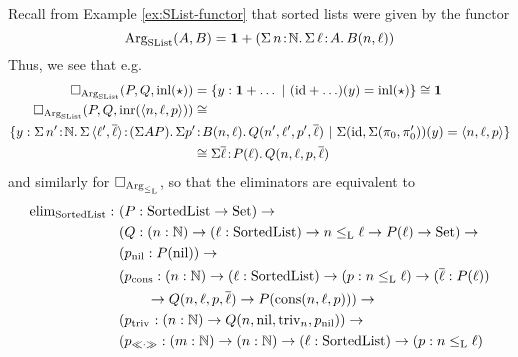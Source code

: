 \documentclass[orivec,envcountsame, ,envcountsect]{llncs}
\begin{document}
 \begin{example}
   Recall from Example \ref{ex:SList-functor} that sorted lists were given by the functor
\[ %
  \ArgSList(A, B) = \one + (\Sigma\, n\!:\!\Nat .\,\Sigma\,\ell\!:\!A.\, B(n,\ell))
\] %
   Thus, we see that e.g.\ 
   \begin{align*}
\BOX_{\ArgSList}(P, Q, \inl(\oneelt)) &=  
\{ y : \one + \ldots \ |\ (\id + \ldots)(y) = \inl(\oneelt) \} \cong \one \\
\BOX_{\ArgSList}(P, Q, \inr(\langle n, \ell, p\rangle)) &\cong \\
\{ y : \Sigma\, n'\!:\!\Nat .\,\Sigma\,\langle \ell', \overline{\ell}\rangle\!:\!(\Sigma A P).\, \Sigma p'\!&:\!B(n,\ell).\,Q(n', \ell', p', \overline{\ell})\ |\ \Sigma(\id, \Sigma(\pi_0, \pi'_0))(y) = \langle n, \ell, p\rangle\} \\
 & \cong \Sigma \overline{\ell}\!:\!P(\ell).\,Q(n, \ell, p, \overline{\ell})
   \end{align*}
   and similarly for $\Box_{\text{Arg}_{\leq_{\text{L}}}}$, so that the eliminators are equivalent to
   \begin{align*}
  \elim_{\SortedList} :\ & (P : \SortedList \to \Set) \to \\
                     & (Q : (n : \Nat) \to (\ell : \SortedList) \to n \lessList \ell \to P(\ell) \to \Set) \to \\
                     & (p_{\nilList} : P(\nilList)) \to \\
                     & (p_{\consListbare} : (n : \Nat) \to (\ell : \SortedList) \to (p : n \lessList \ell) \to (\overline{\ell} : P(\ell)) \\
                     & \qquad \to Q(n, \ell, p, \overline{\ell}) \to P(\consList{n}{\ell}{p})) \to \\
                     & (p_{\nilLess{}} : (n : \Nat) \to Q(n, \nilList, \nilLess{n}, p_{\nilList})) \to \\
                     & (p_{\consLessbare} : (m : \Nat) \to (n : \Nat) \to (\ell : \SortedList) \to (p : n \lessList \ell) \\

\end{align*}
\end{example}
\end{document}
